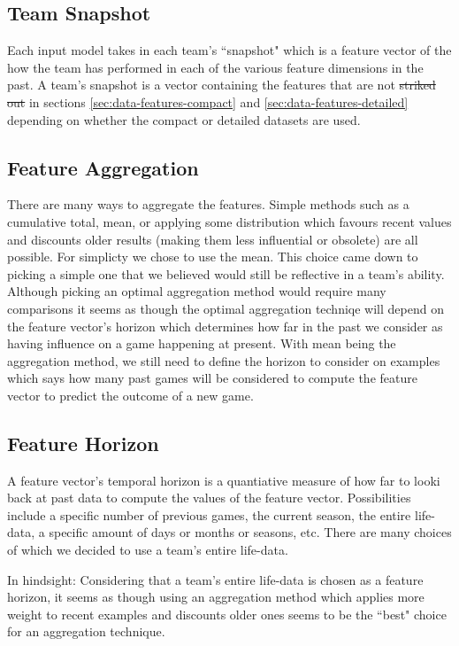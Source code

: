 \documentclass{article} %
\begin{document}
\begin{enumerate}
\subsection{Team Snapshot}
\label{sec:data-team-snapshot}

Each input model takes in each team's ``snapshot" which is a feature vector of the how the team has performed in each of the various feature dimensions in the past.  A team's snapshot is a vector containing the features that are not \sout{striked out} in sections \ref{sec:data-features-compact} and \ref{sec:data-features-detailed} depending on whether the compact or detailed datasets are used.

\subsection{Feature Aggregation}
\label{sec:feature-aggregation}

There are many ways to aggregate the features.  Simple methods such as a cumulative total, mean, or applying some distribution which favours recent values and discounts older results (making them less influential or obsolete) are all possible.  For simplicty we chose to use the mean.  This choice came down to picking a simple one that we believed would still be reflective in a team's ability.  Although picking an optimal aggregation method would require many comparisons it seems as though the optimal aggregation techniqe will depend on the feature vector's horizon which determines how far in the past we consider as having influence on a game happening at present.  With mean being the aggregation method, we still need to define the horizon to consider on examples which says how many past games will be considered to compute the feature vector to predict the outcome of a new game.

\subsection{Feature Horizon}
\label{sec:feature-horizon}

A feature vector's temporal horizon is a quantiative measure of how far to looki back at past data to compute the values of the feature vector.  Possibilities include a specific number of previous games, the current season, the entire life-data, a specific amount of days or months or seasons, etc.  There are many choices of which we decided to use a team's entire life-data.

In hindsight: Considering that a team's entire life-data is chosen as a feature horizon, it seems as though using an aggregation method which applies more weight to recent examples and discounts older ones seems to be the ``best" choice for an aggregation technique.


\end{enumerate}
\end{document}
